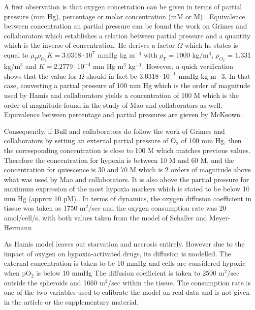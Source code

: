 \documentclass[11pt,a4paper]{article}
\begin{document}
A first observation is that oxygen concetration can be given in terms of partial pressure (mm Hg), percentage or molar concentration (mM or \textmu M) . Equivalence between concentration an partial pressure can be found the work on Grimes and collaborators which establishes a relation between partial pressure and a quantity which is the inverse of concentration. He derives a factor $\Omega$ which he states is equal to $ \rho_{T} \rho_{O_2} K = 3.0318 \cdot 10^7$ mmHg kg m$^{-3}$ with  $\rho_{T}$ = 1000 kg/m$^3$, $\rho_{O_2}$ = 1.331 kg/m$^3$ and $K = 2.2779 \cdot 10^{-4}$ mm Hg  m$^{3}$ kg$^{-1}$.\cite{Grimes2014} However, a quick verification shows that the value for $\Omega$ should in fact be $3.0318 \cdot 10^{-1}$ mmHg kg m${-3}$. In that case, converting a partial pressure of 100 mm Hg which is the order of magnitude used by Hamis and collaborators yields a concentration of 100 \textmu M which is the order of magnitude found in the study of Mao and collaborators as well. Equivalence between percentage and partial pressures are gieven by McKeown.\cite{McKeown2014} %

Consequently, if Bull and collaborators do follow the work of Grimes and collaborators by setting an external partial pressure of O${_2}$ of 100 mm Hg, then the corresponding concentration is close to 100 \textmu M which matches previous values. Therefore the concentration for hypoxia is between 10 \textmu M and 60 \textmu M, and the concentration for quiescence is 30 \textmu and 70 \textmu M which is 2 orders of magnitude above what was used by Mao and collaborators. It is also above the partial pressure for maximum expression of the most hypoxia markers which is stated to be below 10 mm Hg (approx 10 µM).\cite{Grimes2014}\cite{McKeown2014}. In terms of dynamics, the oxygen diffusion coefficient in tissue was taken as 1750 \textmu m$^2$/sec and the oxygen consumption rate was 20 amol/cell/s, with both values taken from the model of Schaller and Meyer-Hermann\cite{Kempf2005}

As Hamis model leaves out starvation and necrosis entirely. However due to the impact of oxygen on hypoxia-activated drugs, its diffusion is modelled. The external concentration is taken to be 10 mmHg and cells are considered hypoxic when pO$_2$ is below 10 mmHg The diffusion coefficient is taken to 2500 \textmu m$^2$/sec outside the spheroids and 1660 \textmu m$^2$/sec within the tissue. The consumption rate is one of the two variables used to calibrate the model on real data and is not given in the article or the supplementary material. 
\end{document}
